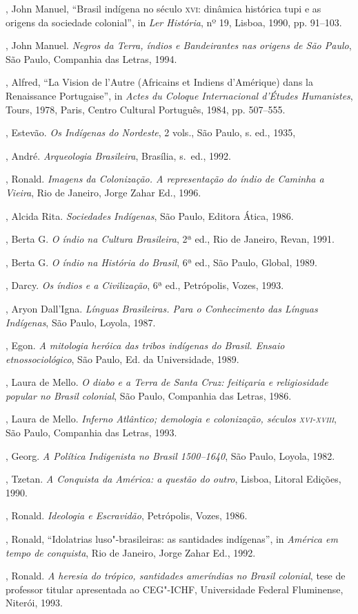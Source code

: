 \begin{bibliohedra}
, John Manuel, ``Brasil indígena no século \textsc{xvi}: dinâmica
histórica tupi e as origens da sociedade colonial'', in \textit{Ler
História}, nº 19, Lisboa, 1990, pp. 91--103.

, John Manuel. \textit{Negros da Terra, índios e Bandeirantes
nas origens de São Paulo}, São Paulo, Companhia das Letras, 1994.

, Alfred, ``La Vision de l'Autre (Africains et Indiens
d'Amérique) dans la Renaissance Portugaise'', in \textit{Actes du
Coloque Internacional d'Études Humanistes}, Tours, 1978, Paris, Centro
Cultural Português, 1984, pp. 507--555. 

, Estevão. \textit{Os Indígenas do Nordeste}, 2 vols.,
São Paulo, s. ed., 1935,

, André. \textit{Arqueologia Brasileira}, Brasília, s.~ed., 1992.

, Ronald. \textit{Imagens da Colonização. A representação do
índio de Caminha a Vieira}, Rio de Janeiro, Jorge Zahar Ed.,
1996. 

, Alcida Rita. \textit{Sociedades Indígenas}, São Paulo, Editora
Ática, 1986.

, Berta G. \textit{O índio na Cultura Brasileira}, 2ª ed., Rio
de Janeiro, Revan, 1991.

, Berta G. \textit{O índio na História do Brasil}, 6ª ed., São
Paulo, Global, 1989.

, Darcy. \textit{Os índios e a Civilização}, 6ª ed.,
Petrópolis, Vozes, 1993.

, Aryon Dall'Igna. \textit{Línguas Brasileiras. Para o
Conhecimento das Línguas Indígenas}, São Paulo, Loyola, 1987.

, Egon. \textit{A mitologia heróica das tribos indígenas do
Brasil. Ensaio etnossociológico}, São Paulo, Ed. da Universidade, 1989.

, Laura de Mello. \textit{O diabo e a Terra de Santa Cruz:
feitiçaria e religiosidade popular no Brasil colonial}, São Paulo,
Companhia das Letras, 1986.

, Laura de Mello. \textit{Inferno Atlântico; demologia e
colonização, séculos \textsc{xvi}-\textsc{xviii}}, São Paulo, Companhia das Letras, 1993.

, Georg. \textit{A Política Indigenista no Brasil 1500--1640}, 
São Paulo, Loyola, 1982.

, Tzetan. \textit{A Conquista da América: a questão do outro}, 
Lisboa, Litoral Edições, 1990.

, Ronald. \textit{Ideologia e Escravidão}, Petrópolis, Vozes,
1986.

, Ronald, ``Idolatrias luso"-brasileiras: as santidades
indígenas'', in \textit{América em tempo de conquista}, Rio de Janeiro,
Jorge Zahar Ed., 1992.

, Ronald. \textit{A heresia do trópico, santidades ameríndias
no Brasil colonial}, tese de professor titular apresentada ao CEG"-ICHF,
Universidade Federal Fluminense, Niterói, 1993.
\end{bibliohedra}
 



